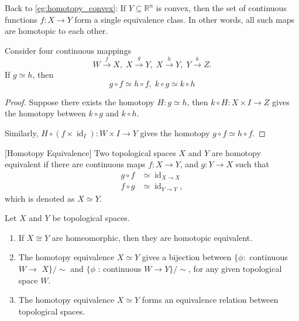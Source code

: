 Back to \autoref{eg:homotopy_convex}: If \(Y \subseteq  {\mathbb{R}}^{n}\) is convex, then the set of continuous functions \(f : X \rightarrow  Y\) form a single equivalence class. In other words, all such maps are homotopic to each other.

\begin{proposition} \label{prop:comp_homotopy} Consider four continuous mappings
\[
W\overset{f}{ \rightarrow  }X, \;X\overset{g}{ \rightarrow  }Y, \;X\overset{h}{ \rightarrow  }Y, \;Y\overset{k}{ \rightarrow  }Z.
\]
If \(g \simeq  h\), then
\[
g \circ  f \simeq  h \circ  f, \;k \circ  g \simeq  k \circ  h
\]
\end{proposition}
\begin{proof} Suppose there exists the homotopy \(H : g \simeq  h\), then \(k \circ  H : X \times  I \rightarrow  Z\) gives the homotopy between \(k \circ  g\) and \(k \circ  h\).

Similarly, \(H \circ  \left( {f \times  {\operatorname{id}}_{I}}\right)  : W \times  I \rightarrow  Y\) gives the homotopy \(g \circ  f \simeq  h \circ  f\).
\end{proof}

\begin{definition} \label{def:homotopy_equivalence} [Homotopy Equivalence] Two topological spaces \(X\) and \(Y\) are homotopy equivalent if there are continuous maps \(f : X \rightarrow  Y\), and \(g : Y \rightarrow  X\) such that
\begin{align*}
g \circ  f &\simeq  {\operatorname{id}}_{X \rightarrow  X}
\\
f \circ  g &\simeq  {\operatorname{id}}_{Y \rightarrow  Y}, 
\end{align*}
which is denoted as \(X \simeq  Y\). 
\end{definition}

\begin{proposition}
Let $X$ and $Y$ be topological spaces.
\begin{enumerate}
    \item If \(X \cong  Y\) are homeomorphic, then they are homotopic equivalent.
    \item The homotopy equivalence \(X \simeq  Y\) gives a bijection between \(\{ \phi  :\) continuous \(W \rightarrow\)  \(X\} / \sim\) and \(\{ \phi\) : continuous \(W \rightarrow  Y\} / \sim\), for any given topological space \(W\).
    \item The homotopy equivalence \(X \simeq  Y\) forms an equivalence relation between topological spaces.
\end{enumerate}
\end{proposition}

